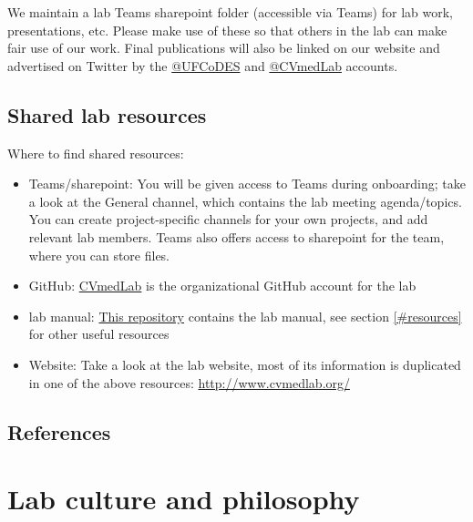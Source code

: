 \documentclass[
  letterpaper,
  DIV=11,
  numbers=noendperiod]{scrreprt}
\begin{document}
We maintain a lab Teams sharepoint folder (accessible via Teams) for lab
work, presentations, etc. Please make use of these so that others in the
lab can make fair use of our work. Final publications will also be
linked on our website and advertised on Twitter by the
\href{https://twitter.com/UFCoDES/}{@UFCoDES} and
\href{https://twitter.com/CVmedLab/}{@CVmedLab} accounts.

\hypertarget{shared-lab-resources}{%
\section{Shared lab resources}\label{shared-lab-resources}}

Where to find shared resources:

\begin{itemize}
\item
  Teams/sharepoint: You will be given access to Teams during onboarding;
  take a look at the General channel, which contains the lab meeting
  agenda/topics. You can create project-specific channels for your own
  projects, and add relevant lab members. Teams also offers access to
  sharepoint for the team, where you can store files.
\item
  GitHub: \href{https://github.com/cvmedlab}{CVmedLab} is the
  organizational GitHub account for the lab
\item
  lab manual: \href{https://github.com/cvmedlab/cvmedlab_manual/}{This
  repository} contains the lab manual, see section \ref{#resources} for
  other useful resources
\item
  Website: Take a look at the lab website, most of its information is
  duplicated in one of the above resources:
  \url{http://www.cvmedlab.org/}
\end{itemize}

\hypertarget{references}{%
\section*{References}\label{references}}



\hypertarget{sec-culture}{%
\chapter{Lab culture and philosophy}\label{sec-culture}}
\end{document}

